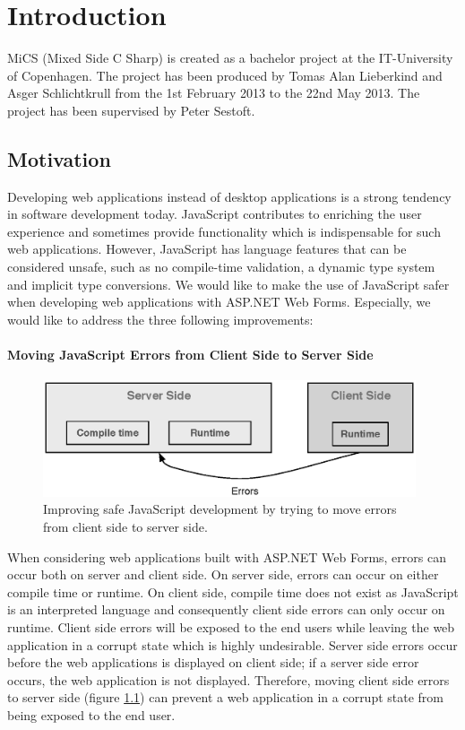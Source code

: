 
\chapter{Introduction} %
\label{cha:introduction}
	MiCS (Mixed Side C Sharp) is created as a bachelor project at the IT-University of Copenhagen. The project  has been produced by Tomas Alan Lieberkind and Asger Schlichtkrull from the 1st February 2013 to the 22nd May 2013. The project has been supervised by Peter Sestoft. 
	\section{Motivation} %
\label{sec:motivation}

Developing web applications instead of desktop applications is a strong tendency in software development today. JavaScript contributes to enriching the user experience and sometimes provide functionality which is indispensable for such web applications. However, JavaScript has language features that can be considered unsafe, such as no compile-time validation, a dynamic type system and implicit type conversions. We would like to make the use of JavaScript safer when developing web applications with ASP.NET Web Forms. Especially, we would like to address the three following improvements:

\subsubsection{Moving JavaScript Errors from Client Side to Server Side} %
	\begin{figure}
		\begin{center}
			\centerline{\includegraphics[width=11cm]{resources/images/MovingErrors.eps}}
		\end{center}
		\caption{Improving safe JavaScript development by trying to move errors from client side to server side.}
		\label{movingErrors}
	\end{figure}
	When considering web applications built with ASP.NET Web Forms, errors can occur both on server and client side. On server side, errors can occur on either compile time or runtime. On client side, compile time does not exist as JavaScript is an interpreted language and consequently client side errors can only occur on runtime. Client side errors will be exposed to the end users while leaving the web application in a corrupt state which is highly undesirable. Server side errors occur before the web applications is displayed on client side; if a server side error occurs, the web application is not displayed. Therefore, moving client side errors to server side (figure \ref{movingErrors}) can prevent a web application in a corrupt state from being exposed to the end user. 

